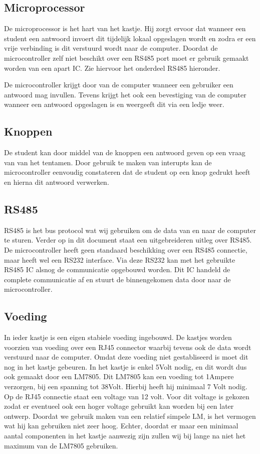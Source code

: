 \subsection*{Microprocessor}
De microprocessor is het hart van het kastje. Hij zorgt ervoor dat wanneer een student een antwoord invoert dit tijdelijk lokaal opgeslagen wordt en zodra er een vrije verbinding is dit verstuurd wordt naar de computer. Doordat de microcontroller zelf niet beschikt over een RS485 port moet er gebruik gemaakt worden van een apart IC. Zie hiervoor het onderdeel RS485 hieronder.

De microcontroller krijgt door van de computer wanneer een gebruiker een antwoord mag invullen. Tevens krijgt het ook een bevestiging van de computer wanneer een antwoord opgeslagen is en weergeeft dit via een ledje weer.

\subsection*{Knoppen}
De student kan door middel van de knoppen een antwoord geven op een vraag van van het tentamen. Door gebruik te maken van interupts kan de microcontroller eenvoudig constateren dat de student op een knop gedrukt heeft en hierna dit antwoord verwerken.

\subsection*{RS485}
RS485 is het bus protocol wat wij gebruiken om de data van en naar de computer te sturen. Verder op in dit document staat een uitgebreideren uitleg over RS485. De microcontroller heeft geen standaard beschikking over een RS485 connectie, maar heeft wel een RS232 interface. Via deze RS232 kan met het gebruikte RS485 IC alsnog de communicatie opgebouwd worden. Dit IC handeld de complete communicatie af en stuurt de binnengekomen data door naar de microcontroller.

\subsection*{Voeding}
In ieder kastje is een eigen stabiele voeding ingebouwd. De kastjes worden voorzien van voeding over een RJ45 connector waarbij tevens ook de data wordt verstuurd naar de computer. Omdat deze voeding niet gestabliseerd is moet dit nog in het kastje gebeuren. In het kastje is enkel 5Volt nodig, en dit wordt dus ook gemaakt door een LM7805. Dit LM7805 kan een voeding tot 1Ampere verzorgen, bij een spanning tot 38Volt. Hierbij heeft hij minimaal 7 Volt nodig. Op de RJ45 connectie staat een voltage van 12 volt. Voor dit voltage is gekozen zodat er eventueel ook een hoger voltage gebruikt kan worden bij een later ontwerp. Doordat we gebruik maken van een relatief simpele LM, is het vermogen wat hij kan gebruiken niet zeer hoog. Echter, doordat er maar een minimaal aantal componenten in het kastje aanwezig zijn zullen wij bij lange na niet het maximum van de LM7805 gebruiken. 

